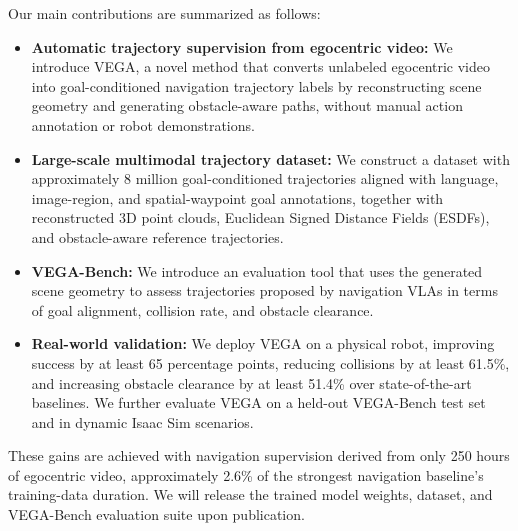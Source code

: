 Our main contributions are summarized as follows:
\begin{itemize}
    \item \textbf{Automatic trajectory supervision from egocentric video:} We introduce VEGA, a novel method that converts unlabeled egocentric video into goal-conditioned navigation trajectory labels by reconstructing scene geometry and generating obstacle-aware paths, without manual action annotation or robot demonstrations.
    \item \textbf{Large-scale multimodal trajectory dataset:} We construct a dataset with approximately 8 million goal-conditioned trajectories aligned with language, image-region, and spatial-waypoint goal annotations, together with reconstructed 3D point clouds, Euclidean Signed Distance Fields (ESDFs), and obstacle-aware reference trajectories.

    \item \textbf{VEGA-Bench:} We introduce an evaluation tool that uses the generated scene geometry to assess trajectories proposed by navigation VLAs in terms of goal alignment, collision rate, and obstacle clearance.

    \item \textbf{Real-world validation:}
    We deploy VEGA on a physical robot, improving success by at least 65 percentage points, reducing collisions by at least 61.5\%, and increasing obstacle clearance by at least 51.4\% over state-of-the-art baselines. We further evaluate VEGA on a held-out VEGA-Bench test set and in dynamic Isaac Sim scenarios.
\end{itemize}

These gains are achieved with navigation supervision derived from only 250 hours of egocentric video, approximately 2.6\% of the strongest navigation baseline's training-data duration.
We will release the trained model weights, dataset, and VEGA-Bench evaluation suite upon publication.
